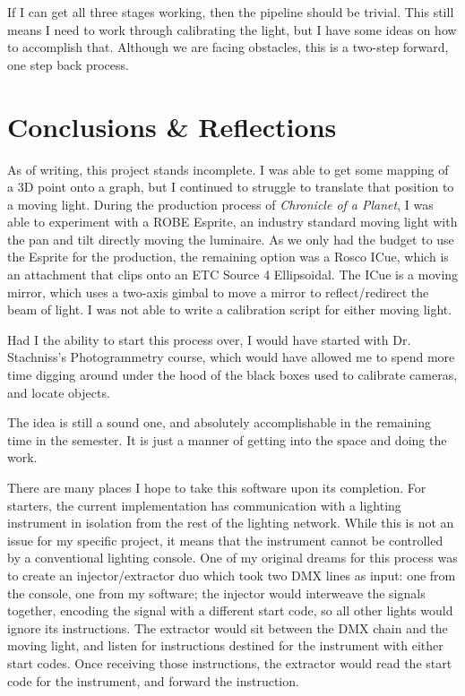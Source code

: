 \documentclass[
    12pt,
    twoside,
    bibstyle=chicago,
    headerstyle=uppercase,
	bibfile=biblatex_updating.bib
]{reedthesis}
\begin{document}
If I can get all three stages working, then the pipeline should be trivial. This still means I need to work through calibrating the light, but I have some ideas on how to accomplish that. Although we are facing obstacles, this is a two-step forward, one step back process.



\chapter*{Conclusions \& Reflections}
	\setcounter{chapter}{4}
	\setcounter{section}{0}
	
As of writing, this project stands incomplete. I was able to get some mapping of a 3D point onto a graph, but I continued to struggle to translate that position to a moving light. During the production process of \textit{Chronicle of a Planet}, I was able to experiment with a ROBE Esprite, an industry standard moving light with the pan and tilt directly moving the luminaire. As we only had the budget to use the Esprite for the production, the remaining option was a Rosco ICue, which is an attachment that clips onto an ETC Source 4 Ellipsoidal. The ICue is a moving mirror, which uses a two-axis gimbal to move a mirror to reflect/redirect the beam of light. I was not able to write a calibration script for either moving light.

Had I the ability to start this process over, I would have started with Dr. Stachniss's Photogrammetry course, which would have allowed me to spend more time digging around under the hood of the black boxes used to calibrate cameras, and locate objects.

The idea is still a sound one, and absolutely accomplishable in the remaining time in the semester. It is just a manner of getting into the space and doing the work.

There are many places I hope to take this software upon its completion. For starters, the current implementation has communication with a lighting instrument in isolation from the rest of the lighting network. While this is not an issue for my specific project, it means that the instrument cannot be controlled by a conventional lighting console. One of my original dreams for this process was to create an injector/extractor duo which took two DMX lines as input: one from the console, one from my software; the injector would interweave the signals together, encoding the signal with a different start code, so all other lights would ignore its instructions. The extractor would sit between the DMX chain and the moving light, and listen for instructions destined for the instrument with either start codes. Once receiving those instructions, the extractor would read the start code for the instrument, and forward the instruction.
\end{document}
